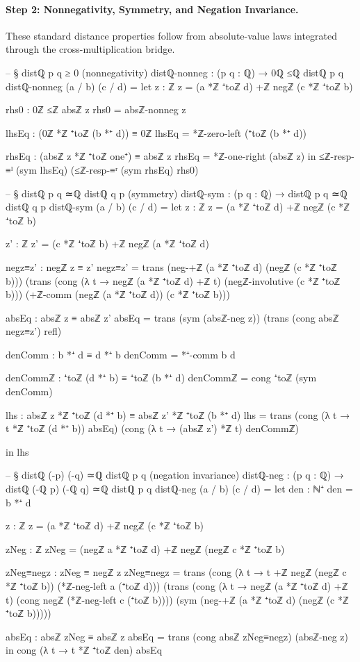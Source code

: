 \documentclass[11pt,a4paper]{book}
\begin{document}
\paragraph{Step 2: Nonnegativity, Symmetry, and Negation Invariance.}
These standard distance properties follow from absolute-value laws
integrated through the cross-multiplication bridge.

\begin{code}
-- § distℚ p q ≥ 0 (nonnegativity)
distℚ-nonneg : (p q : ℚ) → 0ℚ ≤ℚ distℚ p q
distℚ-nonneg (a / b) (c / d) =
  let
    z : ℤ
    z = (a *ℤ ⁺toℤ d) +ℤ negℤ (c *ℤ ⁺toℤ b)

    rhs0 : 0ℤ ≤ℤ absℤ z
    rhs0 = absℤ-nonneg z

    lhsEq : (0ℤ *ℤ ⁺toℤ (b *⁺ d)) ≡ 0ℤ
    lhsEq = *ℤ-zero-left (⁺toℤ (b *⁺ d))

    rhsEq : (absℤ z *ℤ ⁺toℤ one⁺) ≡ absℤ z
    rhsEq = *ℤ-one-right (absℤ z)
  in
  ≤ℤ-resp-≡ˡ (sym lhsEq) (≤ℤ-resp-≡ʳ (sym rhsEq) rhs0)

-- § distℚ p q ≃ℚ distℚ q p (symmetry)
distℚ-sym : (p q : ℚ) → distℚ p q ≃ℚ distℚ q p
distℚ-sym (a / b) (c / d) =
  let z : ℤ
      z = (a *ℤ ⁺toℤ d) +ℤ negℤ (c *ℤ ⁺toℤ b)

      z' : ℤ
      z' = (c *ℤ ⁺toℤ b) +ℤ negℤ (a *ℤ ⁺toℤ d)

      negz≡z' : negℤ z ≡ z'
      negz≡z' =
        trans
          (neg-+ℤ (a *ℤ ⁺toℤ d) (negℤ (c *ℤ ⁺toℤ b)))
          (trans
            (cong (λ t → negℤ (a *ℤ ⁺toℤ d) +ℤ t) (negℤ-involutive (c *ℤ ⁺toℤ b)))
            (+ℤ-comm (negℤ (a *ℤ ⁺toℤ d)) (c *ℤ ⁺toℤ b)))

      absEq : absℤ z ≡ absℤ z'
      absEq =
        trans
          (sym (absℤ-neg z))
          (trans
            (cong absℤ negz≡z')
            refl)

      denComm : b *⁺ d ≡ d *⁺ b
      denComm = *⁺-comm b d

      denCommℤ : ⁺toℤ (d *⁺ b) ≡ ⁺toℤ (b *⁺ d)
      denCommℤ = cong ⁺toℤ (sym denComm)

      lhs : absℤ z *ℤ ⁺toℤ (d *⁺ b) ≡ absℤ z' *ℤ ⁺toℤ (b *⁺ d)
      lhs =
        trans
          (cong (λ t → t *ℤ ⁺toℤ (d *⁺ b)) absEq)
          (cong (λ t → (absℤ z') *ℤ t) denCommℤ)

  in
  lhs

-- § distℚ (-p) (-q) ≃ℚ distℚ p q (negation invariance)
distℚ-neg : (p q : ℚ) → distℚ (-ℚ p) (-ℚ q) ≃ℚ distℚ p q
distℚ-neg (a / b) (c / d) =
  let
    den : ℕ⁺
    den = b *⁺ d

    z : ℤ
    z = (a *ℤ ⁺toℤ d) +ℤ negℤ (c *ℤ ⁺toℤ b)

    zNeg : ℤ
    zNeg = (negℤ a *ℤ ⁺toℤ d) +ℤ negℤ (negℤ c *ℤ ⁺toℤ b)

    zNeg≡negz : zNeg ≡ negℤ z
    zNeg≡negz =
      trans
        (cong (λ t → t +ℤ negℤ (negℤ c *ℤ ⁺toℤ b)) (*ℤ-neg-left a (⁺toℤ d)))
        (trans
          (cong (λ t → negℤ (a *ℤ ⁺toℤ d) +ℤ t)
            (cong negℤ (*ℤ-neg-left c (⁺toℤ b))))
          (sym (neg-+ℤ (a *ℤ ⁺toℤ d) (negℤ (c *ℤ ⁺toℤ b)))))

    absEq : absℤ zNeg ≡ absℤ z
    absEq = trans (cong absℤ zNeg≡negz) (absℤ-neg z)
  in
  cong (λ t → t *ℤ ⁺toℤ den) absEq
\end{code}
\end{document}
